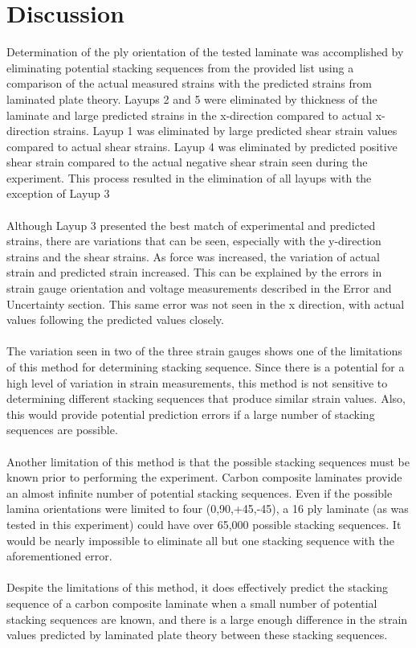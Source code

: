\documentclass[12pt]{article}
\begin{document}
\section{Discussion}
Determination of the ply orientation of the tested laminate was accomplished by eliminating potential stacking sequences from the provided list using a comparison of the actual measured strains with the predicted strains from laminated plate theory. Layups 2 and 5 were eliminated by thickness of the laminate and large predicted strains in the x-direction compared to actual x-direction strains. Layup 1 was eliminated by large predicted shear strain values compared to actual shear strains. Layup 4 was eliminated by predicted positive shear strain compared to the actual negative shear strain seen during the experiment. This process resulted in the elimination of all layups with the exception of Layup 3
\\ \\ 
Although Layup 3 presented the best match of experimental and predicted strains, there are variations that can be seen, especially with the y-direction strains and the shear strains. As force was increased, the variation of actual strain and predicted strain increased. This can be explained by the errors in strain gauge orientation and voltage measurements described in the Error and Uncertainty section. This same error was not seen in the x direction, with actual values following the predicted values closely.
\\ \\
The variation seen in two of the three strain gauges shows one of the limitations of this method for determining stacking sequence. Since there is a potential for a high level of variation in strain measurements, this method is not sensitive to determining different stacking sequences that produce similar strain values. Also, this would provide potential prediction errors if a large number of stacking sequences are possible. 
\\ \\
Another limitation of this method is that the possible stacking sequences must be known prior to performing the experiment. Carbon composite laminates provide an almost infinite number of potential stacking sequences. Even if the possible lamina orientations were limited to four (0,90,+45,-45), a 16 ply laminate (as was tested in this experiment) could have over 65,000 possible stacking sequences. It would be nearly impossible to eliminate all but one stacking sequence with the aforementioned error.
\\ \\
Despite the limitations of this method, it does effectively predict the stacking sequence of a carbon composite laminate when a small number of potential stacking sequences are known, and there is a large enough difference in the strain values predicted by laminated plate theory between these stacking sequences.
 
\end{document}
